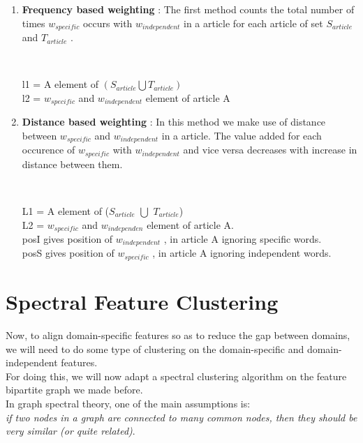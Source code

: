 \documentclass{report}
\begin{document}
\begin{enumerate}
\item \textbf{Frequency based weighting} : The first method counts the total number of times \(w_{specific}\) occurs with \(w_{independent}\) in a article for each article of set \(S_{article}\) and \(T_{article}\) .
\begin{center}
\\
\end{center}
l1 = A element of \((S_{article}\bigcup T_{article})\)\\ 
l2 = \(w_{specific}\) and \(w_{independent}\) element of article A

\item \textbf{Distance based weighting} : In this method we make use of distance between \(w_{specific}\) and \(w_{independent}\) in a article. The value added for each occurence of \(w_{specific}\) with \(w_{independent}\) and vice versa decreases with increase in distance between them.
\begin{center}
\\
\end{center}
L1 = A element of (\(S_{article}\) \(\bigcup\) \(T_{article}\))\\
L2 = \(w_{specific}\) and \(w_{independen}\) element of article A.\\
posI gives position of \(w_{independent}\) , in article A ignoring specific words.\\
posS gives position of \(w_{specific}\) , in article A ignoring independent words.\\
\end{enumerate}

\section{Spectral Feature Clustering}

Now, to align domain-specific features so as to reduce the gap between domains, we will need to do some type of clustering on the domain-specific and domain-independent features.\\
\linebreak
For doing this, we will now adapt a spectral clustering algorithm on the feature bipartite graph we made before.\\
\linebreak
In graph spectral theory, one of the main assumptions is:\\
\emph{if two nodes in a graph are connected to many common nodes,
then they should be very similar (or quite related)}.\\
\linebreak
\end{document}
